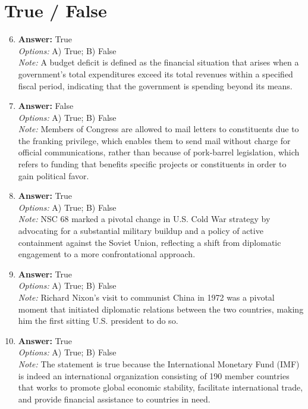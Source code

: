 \documentclass[12pt]{article}
\begin{document}
\section*{True / False}
\begin{enumerate}[label=\arabic*.]
\setcounter{enumi}{5}
\item \textbf{Answer:} True
\\ \textit{Options:} A) True; B) False
\\ \textit{Note:} A budget deficit is defined as the financial situation that arises when a government's total expenditures exceed its total revenues within a specified fiscal period, indicating that the government is spending beyond its means.
\item \textbf{Answer:} False
\\ \textit{Options:} A) True; B) False
\\ \textit{Note:} Members of Congress are allowed to mail letters to constituents due to the franking privilege, which enables them to send mail without charge for official communications, rather than because of pork-barrel legislation, which refers to funding that benefits specific projects or constituents in order to gain political favor.
\item \textbf{Answer:} True
\\ \textit{Options:} A) True; B) False
\\ \textit{Note:} NSC 68 marked a pivotal change in U.S. Cold War strategy by advocating for a substantial military buildup and a policy of active containment against the Soviet Union, reflecting a shift from diplomatic engagement to a more confrontational approach.
\item \textbf{Answer:} True
\\ \textit{Options:} A) True; B) False
\\ \textit{Note:} Richard Nixon's visit to communist China in 1972 was a pivotal moment that initiated diplomatic relations between the two countries, making him the first sitting U.S. president to do so.
\item \textbf{Answer:} True
\\ \textit{Options:} A) True; B) False
\\ \textit{Note:} The statement is true because the International Monetary Fund (IMF) is indeed an international organization consisting of 190 member countries that works to promote global economic stability, facilitate international trade, and provide financial assistance to countries in need.
\end{enumerate}
\end{document}
